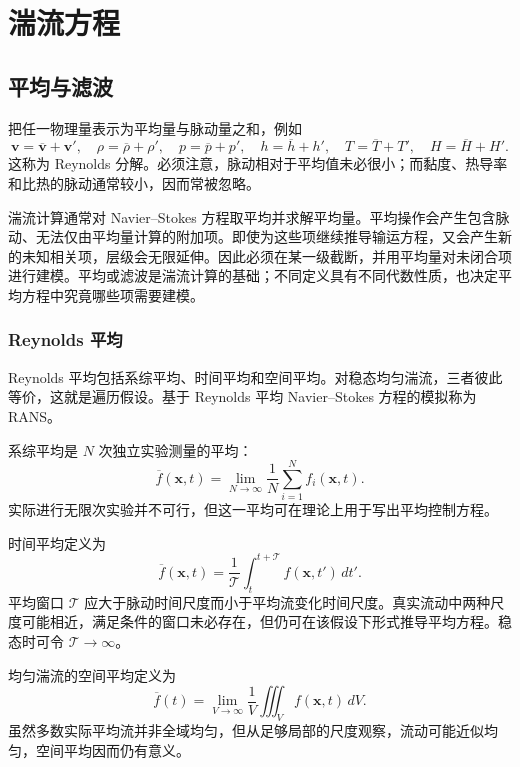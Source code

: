 \documentclass[11pt,a4paper,openany,fontset=none]{ctexbook}
\begin{document}
\chapter{湍流方程}

\section{平均与滤波}

把任一物理量表示为平均量与脉动量之和，例如
\begin{equation}
 \bm v=\overline{\bm v}+\bm v',\quad
 \rho=\overline\rho+\rho',\quad p=\overline p+p',\quad
 h=\overline h+h',\quad T=\overline T+T',\quad H=\overline H+H'. \tag{5.1.1}
\end{equation}
这称为 Reynolds 分解。必须注意，脉动相对于平均值未必很小；而黏度、热导率和比热的脉动通常较小，因而常被忽略。

湍流计算通常对 Navier--Stokes 方程取平均并求解平均量。平均操作会产生包含脉动、无法仅由平均量计算的附加项。即使为这些项继续推导输运方程，又会产生新的未知相关项，层级会无限延伸。因此必须在某一级截断，并用平均量对未闭合项进行建模。平均或滤波是湍流计算的基础；不同定义具有不同代数性质，也决定平均方程中究竟哪些项需要建模。

\subsection{Reynolds 平均}

Reynolds 平均包括系综平均、时间平均和空间平均。对稳态均匀湍流，三者彼此等价，这就是遍历假设。基于 Reynolds 平均 Navier--Stokes 方程的模拟称为 RANS。

系综平均是 $N$ 次独立实验测量的平均：
\begin{equation}
 \overline f(\bm x,t)=\lim_{N\to\infty}\frac1N\sum_{i=1}^{N}f_i(\bm x,t). \tag{5.1.2}
\end{equation}
实际进行无限次实验并不可行，但这一平均可在理论上用于写出平均控制方程。

时间平均定义为
\begin{equation}
 \overline f(\bm x,t)=\frac1{\mathcal T}\int_t^{t+\mathcal T}f(\bm x,t')\,dt'. \tag{5.1.3}
\end{equation}
平均窗口 $\mathcal T$ 应大于脉动时间尺度而小于平均流变化时间尺度。真实流动中两种尺度可能相近，满足条件的窗口未必存在，但仍可在该假设下形式推导平均方程。稳态时可令 $\mathcal T\to\infty$。

均匀湍流的空间平均定义为
\begin{equation}
 \overline f(t)=\lim_{V\to\infty}\frac1V\iiint_V f(\bm x,t)\,dV. \tag{5.1.5}
\end{equation}
虽然多数实际平均流并非全域均匀，但从足够局部的尺度观察，流动可能近似均匀，空间平均因而仍有意义。
\end{document}
